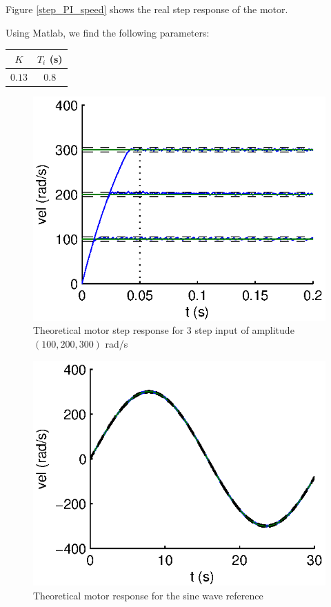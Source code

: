 Figure \ref{step_PI_speed} shows the real step response of the motor.

Using Matlab, we find the following parameters:
\begin{center}
 \begin{tabular}{|c|c|}
 \hline
 $K$ & $T_i$ (s) \\
 \hline
 $0.13$ & $0.8$ \\
 \hline
 \end{tabular}
\end{center}

\begin{center}
\begin{figure}[ht]
 \includegraphics[width=\linewidth]{fig/StepPIspeed.eps}
 \caption{Theoretical motor step response for 3 step input of amplitude $(100,200,300)$ rad/s}
 \label{stepPIspeed}
\end{figure}
\end{center}

\begin{center}
\begin{figure}[ht]
 \includegraphics[width=\linewidth]{fig/SinPIspeed.eps}
 \caption{Theoretical motor response for the sine wave reference}
 \label{sinPIspeed}
\end{figure}
\end{center}

